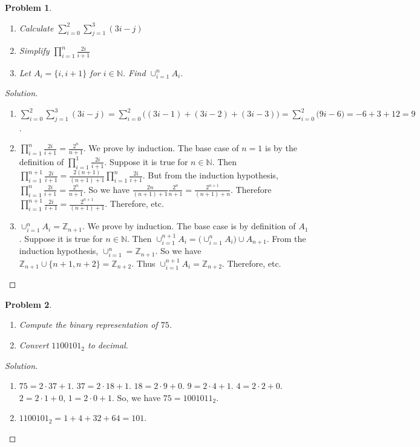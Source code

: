 \documentclass[oneside]{book}
\theoremstyle{mystyle}
\newtheorem{problem}{Problem}[section]
\begin{document}
\begin{problem}
\
\begin{enumerate}
    \item Calculate $\sum_{i=0}^{2}\sum_{j=1}^{3}(3i-j)$
    \item Simplify $\prod_{i=1}^{n} \frac{2i}{i+1}$
    \item Let $A_{i} = \{i,i+1\}$ for $i\in \mathbb{N}$. Find $\cup_{i=1}^{n} A_{i}$.
\end{enumerate}
\end{problem}
\begin{proof}[Solution]
\
\begin{enumerate}
    \item $\sum_{i=0}^{2}\sum_{j=1}^{3}(3i-j) = \sum_{i=0}^{2}\big((3i-1)+(3i-2)+(3i-3)\big) = \sum_{i=0}^{2}\big(9i-6\big) = -6+3+12 = 9$.
    \item $\prod_{i=1}^{n} \frac{2i}{i+1}= \frac{2^n}{n+1}$. We prove by induction. The base case of $n=1$ is by the definition of $\prod_{i=1}^{1}\frac{2i}{i+1}$. Suppose it is true for $n\in \mathbb{N}$. Then $\prod_{i=1}^{n+1} \frac{2i}{i+1} = \frac{2(n+1)}{(n+1)+1}\prod_{i=1}^{n}\frac{2i}{i+1}$. But from the induction hypothesis, $\prod_{i=1}^{n}\frac{2i}{i+1} = \frac{2^n}{n+1}$. So we have $\frac{2n}{(n+1)+1}\frac{2^n}{n+1} = \frac{2^{n+1}}{(n+1)+n}$. Therefore $\prod_{i=1}^{n+1} \frac{2i}{i+1} = \frac{2^{n+1}}{(n+1)+1}$. Therefore, etc.
    \item $\cup_{i=1}^{n} A_i = \mathbb{Z}_{n+1}$. We prove by induction. The base case is by definition of $A_1$. Suppose it is true for $n\in \mathbb{N}$. Then $\cup_{i=1}^{n+1}A_i = \big(\cup_{i=1}^{n}A_{i}\big) \cup A_{n+1}$. From the induction hypothesis, $\cup_{i=1}^{n} = \mathbb{Z}_{n+1}$. So we have $\mathbb{Z}_{n+1} \cup \{n+1,n+2\} = \mathbb{Z}_{n+2}$. Thus $\cup_{i=1}^{n+1} A_{i} = \mathbb{Z}_{n+2}$. Therefore, etc.
\end{enumerate}
\end{proof}
\begin{problem}
\
\begin{enumerate}
    \item Compute the binary representation of $75$.
    \item Convert $1100101_2$ to decimal.
\end{enumerate}
\end{problem}
\begin{proof}[Solution]
\
\begin{enumerate}
    \item $75 = 2\cdot 37+1$. $37 = 2\cdot 18+1$. $18 = 2\cdot 9 + 0$. $9 = 2\cdot 4 + 1$. $4 = 2\cdot 2+0$. $2 = 2\cdot 1+0$, $1= 2\cdot 0 + 1$. So, we have $75 = 1001011_2$.
    \item $1100101_2 = 1+4+32+64 = 101$.
\end{enumerate}
\end{proof}
\end{document}
